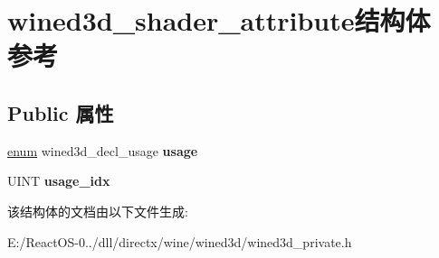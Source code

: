 \hypertarget{structwined3d__shader__attribute}{}\section{wined3d\+\_\+shader\+\_\+attribute结构体 参考}
\label{structwined3d__shader__attribute}
\subsection*{Public 属性}
\begin{DoxyCompactItemize}
\item 
\mbox{\label{structwined3d__shader__attribute_ad1396a2f2645d534b2a5c0d7664fdcb9}} 
\hyperlink{interfaceenum}{enum} wined3d\+\_\+decl\+\_\+usage {\bfseries usage}
\item 
\mbox{\label{structwined3d__shader__attribute_ae3f041917737326f612ae1f088e2199c}} 
U\+I\+NT {\bfseries usage\+\_\+idx}
\end{DoxyCompactItemize}


该结构体的文档由以下文件生成\+:\begin{DoxyCompactItemize}
\item 
E\+:/\+React\+O\+S-\/0../dll/directx/wine/wined3d/wined3d\+\_\+private.\+h\end{DoxyCompactItemize}
